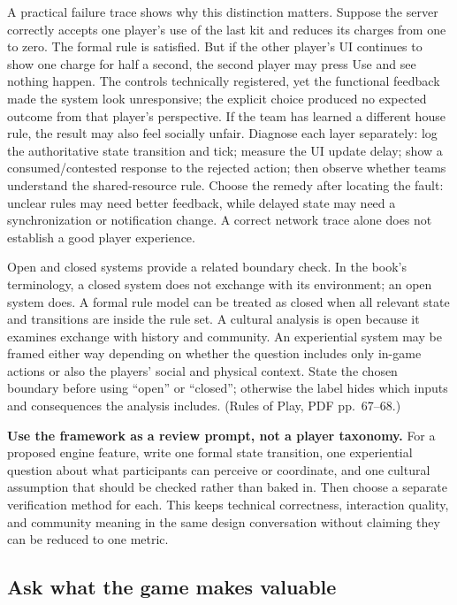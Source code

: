 A practical failure trace shows why this distinction matters. Suppose the server correctly accepts one player's use of the last kit and reduces its charges from one to zero. The formal rule is satisfied. But if the other player's UI continues to show one charge for half a second, the second player may press Use and see nothing happen. The controls technically registered, yet the functional feedback made the system look unresponsive; the explicit choice produced no expected outcome from that player's perspective. If the team has learned a different house rule, the result may also feel socially unfair. Diagnose each layer separately: log the authoritative state transition and tick; measure the UI update delay; show a consumed/contested response to the rejected action; then observe whether teams understand the shared-resource rule. Choose the remedy after locating the fault: unclear rules may need better feedback, while delayed state may need a synchronization or notification change. A correct network trace alone does not establish a good player experience.

Open and closed systems provide a related boundary check. In the book's terminology, a closed system does not exchange with its environment; an open system does. A formal rule model can be treated as closed when all relevant state and transitions are inside the rule set. A cultural analysis is open because it examines exchange with history and community. An experiential system may be framed either way depending on whether the question includes only in-game actions or also the players' social and physical context. State the chosen boundary before using ``open'' or ``closed''; otherwise the label hides which inputs and consequences the analysis includes. (Rules of Play, PDF pp.~67--68.)

\textbf{Use the framework as a review prompt, not a player taxonomy.} For a proposed engine feature, write one formal state transition, one experiential question about what participants can perceive or coordinate, and one cultural assumption that should be checked rather than baked in. Then choose a separate verification method for each. This keeps technical correctness, interaction quality, and community meaning in the same design conversation without claiming they can be reduced to one metric.

\subsection{Ask what the game makes valuable}\label{05-engine-i-ch009-ask-what-the-game-makes-valuable}

